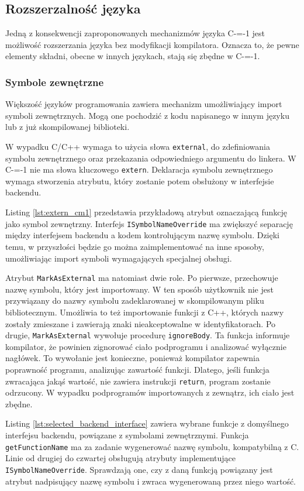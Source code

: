 \subsection{Rozszerzalność języka}
\label{Language_extensibility}
Jedną z konsekwencji zaproponowanych mechanizmów języka C-=-1 jest możliwość rozszerzania języka bez modyfikacji kompilatora.
Oznacza to, że pewne elementy składni, obecne w innych językach, stają się zbędne w C-=-1.
\subsubsection{Symbole zewnętrzne}
Większość języków programowania zawiera mechanizm umożliwiający import symboli zewnętrznych.
Mogą one pochodzić z kodu napisanego w innym języku lub z już skompilowanej biblioteki.

W wypadku C/C++ wymaga to użycia słowa \lstinline{external}, do zdefiniowania symbolu zewnętrznego oraz przekazania odpowiedniego argumentu do linkera.
W C-=-1 nie ma słowa kluczowego \lstinline{extern}.
Deklaracja symbolu zewnętrznego wymaga stworzenia atrybutu, który zostanie potem obsłużony w interfejsie backendu.

Listing \ref{lst:extern_cm1} przedstawia przykładową atrybut oznaczającą funkcję jako symbol zewnętrzny.
Interfejs \lstinline{ISymbolNameOverride} ma zwiększyć separację między interfejsem backendu a kodem kontrolującym nazwę symbolu.
Dzięki temu, w przyszłości będzie go można zaimplementować na inne sposoby, umożliwiając import symboli wymagających specjalnej obsługi.

Atrybut \lstinline{MarkAsExternal} ma natomiast dwie role.
Po pierwsze, przechowuje nazwę symbolu, który jest importowany.
W ten sposób użytkownik nie jest przywiązany do nazwy symbolu zadeklarowanej w skompilowanym pliku bibliotecznym.
Umożliwia to też importowanie funkcji z C++, których nazwy zostały zmieszane i zawierają znaki nieakceptowalne w identyfikatorach.
Po drugie, \lstinline{MarkAsExternal} wywołuje procedurę \lstinline{ignoreBody}.
Ta funkcja informuje kompilator, że powinien zignorować ciało podprogramu i analizować wyłącznie nagłówek.
To wywołanie jest konieczne, ponieważ kompilator zapewnia poprawność programu, analizując zawartość funkcji.
Dlatego, jeśli funkcja zwracająca jakąś wartość, nie zawiera instrukcji \lstinline{return}, program zostanie odrzucony.
W wypadku podprogramów importowanych z zewnątrz, ich ciało jest zbędne.

Listing \ref{lst:selected_backend_interface} zawiera wybrane funkcje z domyślnego interfejsu backendu, powiązane z symbolami zewnętrznymi.
Funkcja \lstinline{getFunctionName} ma za zadanie wygenerować nazwę symbolu, kompatybilną z C.
Linie od drugiej do czwartej obsługują atrybuty implementujące \lstinline{ISymbolNameOverride}.
Sprawdzają one, czy z daną funkcją powiązany jest atrybut nadpisujący nazwę symbolu i zwraca wygenerowaną przez niego wartość.

